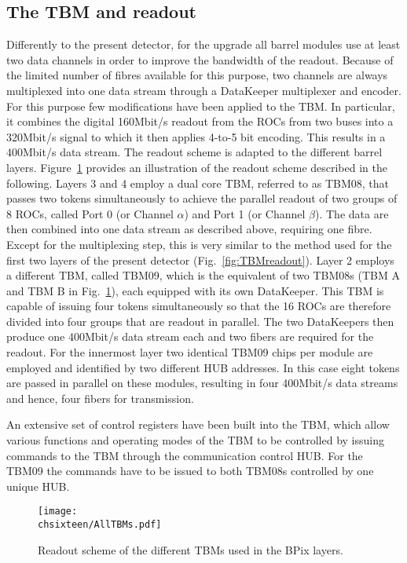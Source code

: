 \subsection*{The TBM and readout}

Differently to the present detector, for the upgrade all barrel modules use at least two data channels in order to improve the bandwidth of the readout.
Because of the limited number of fibres available for this purpose, two channels are always multiplexed into one data stream through a DataKeeper multiplexer and encoder.
For this purpose few modifications have been applied to the TBM.
In particular, it combines the digital 160\unit{Mbit/s} readout from the ROCs from two buses into a 320\unit{Mbit/s} signal to which it then applies 4-to-5 bit encoding. This results in a 400\unit{Mbit/s} data stream.
The readout scheme is adapted to the different barrel layers.
Figure~\ref{fig:Phase1TBMRO} provides an illustration of the readout scheme described in the following.
Layers 3 and 4 employ a dual core TBM, referred to as TBM08, that passes two tokens simultaneously to achieve the parallel readout of two groups of 8 ROCs, called Port 0 (or Channel $\alpha$) and Port 1 (or Channel $\beta$). 
The data are then combined into one data stream as described above, requiring one fibre. Except for the multiplexing step, this is very similar to the method used for the first two layers of the present detector (Fig.~\ref{fig:TBMreadout}).
Layer 2 employs a different TBM, called TBM09, which is the equivalent of two TBM08s (TBM A and TBM B in Fig.~\ref{fig:Phase1TBMRO}), each equipped with its own DataKeeper. This TBM is capable of issuing four tokens simultaneously so that the 16 ROCs are therefore divided into four groups that are readout in parallel. The two DataKeepers then produce one 400\unit{Mbit/s} data stream each and two fibers are required for the readout.
For the innermost layer two identical TBM09 chips per module are employed and identified by two different HUB addresses. In this case eight tokens are passed in parallel on these modules, resulting in four 400\unit{Mbit/s} data streams and hence, four fibers for transmission.

An extensive set of control registers have been built into the TBM, which allow various functions and operating modes of the TBM to be controlled by issuing commands to the TBM through the communication control HUB.
For the TBM09 the commands have to be issued to both TBM08s controlled by one unique HUB.

\begin{figure}[!htb]
 \begin{center}
 \texttt{[image: \\chsixteen/AllTBMs.pdf]}
 \end{center}
 \caption{Readout scheme of the different TBMs used in the BPix layers.}
 \label{fig:Phase1TBMRO}
\end{figure}

